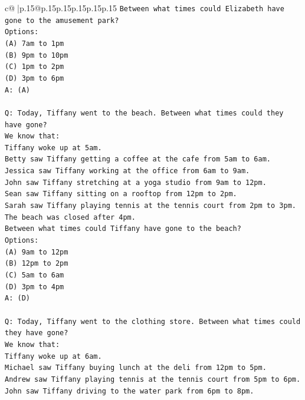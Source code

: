 \documentclass{article}
\begin{document}
{\begin{supertabular}{c@{$\;$}|p{.15\linewidth}@{}p{.15\linewidth}p{.15\linewidth}p{.15\linewidth}p{.15\linewidth}p{.15\linewidth}}
{{{\texttt{Between what times could Elizabeth have gone to the amusement park?} \\
\texttt{Options:} \\
\texttt{(A) 7am to 1pm} \\
\texttt{(B) 9pm to 10pm} \\
\texttt{(C) 1pm to 2pm} \\
\texttt{(D) 3pm to 6pm} \\
\texttt{A: (A)} \\
\\ 
\texttt{Q: Today, Tiffany went to the beach. Between what times could they have gone?} \\
\texttt{We know that:} \\
\texttt{Tiffany woke up at 5am.} \\
\texttt{Betty saw Tiffany getting a coffee at the cafe from 5am to 6am.} \\
\texttt{Jessica saw Tiffany working at the office from 6am to 9am.} \\
\texttt{John saw Tiffany stretching at a yoga studio from 9am to 12pm.} \\
\texttt{Sean saw Tiffany sitting on a rooftop from 12pm to 2pm.} \\
\texttt{Sarah saw Tiffany playing tennis at the tennis court from 2pm to 3pm.} \\
\texttt{The beach was closed after 4pm.} \\
\texttt{Between what times could Tiffany have gone to the beach?} \\
\texttt{Options:} \\
\texttt{(A) 9am to 12pm} \\
\texttt{(B) 12pm to 2pm} \\
\texttt{(C) 5am to 6am} \\
\texttt{(D) 3pm to 4pm} \\
\texttt{A: (D)} \\
\\ 
\texttt{Q: Today, Tiffany went to the clothing store. Between what times could they have gone?} \\
\texttt{We know that:} \\
\texttt{Tiffany woke up at 6am.} \\
\texttt{Michael saw Tiffany buying lunch at the deli from 12pm to 5pm.} \\
\texttt{Andrew saw Tiffany playing tennis at the tennis court from 5pm to 6pm.} \\
\texttt{John saw Tiffany driving to the water park from 6pm to 8pm.} \\
}}}
\end{supertabular}}
\end{document}
